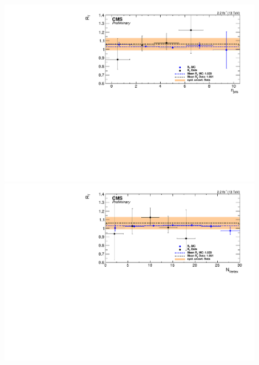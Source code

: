 \begin{figure}[htbp]
  \centering
  \begin{minipage}[t]{0.3\textwidth}
    \includegraphics[width=\textwidth]{bkgd/figs/Triggereff_SFvsOF_Syst_PFHT_HighHTExclusiveForward_Run2015_25ns_NJets_None_NonIso_MC.pdf}
  \end{minipage}
  \begin{minipage}[t]{0.3\textwidth}
    \includegraphics[width=\textwidth]{bkgd/figs/Triggereff_SFvsOF_Syst_PFHT_HighHTExclusiveForward_Run2015_25ns_nVtx_None_NonIso_MC.pdf}
  \end{minipage}
  \begin{minipage}[t]{0.3\textwidth}

\end{minipage}
\end{figure}
